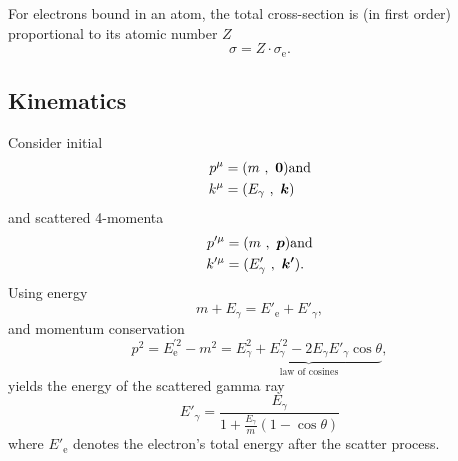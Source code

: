 For electrons bound in an atom, the total cross-section is (in first order) proportional to its atomic number $Z$
\begin{equation*}
	\sigma = Z\cdot\sigma_\text{e}.
\end{equation*}
\subsection{Kinematics}
Consider initial
\begin{align*}
	p^\mu &= (m\ ,\ \boldsymbol{0}) \text{and}\\
	k^\mu &= (E_\gamma\ ,\ \boldsymbol{k})
\end{align*}
and scattered 4-momenta
\begin{align*}
	p'^\mu &= (m\ ,\ \boldsymbol{p}) \text{and}\\
	k'^\mu &= (E'_\gamma\ ,\ \boldsymbol{k'}).
\end{align*}
Using energy
\begin{equation*}
	m + E_\gamma = E'_\text{e} + E'_\gamma,
\end{equation*}
and momentum conservation
\begin{equation*}
	p^2 = E_\text{e}^{'2} - m^2 = \underbrace{E_\gamma^2 + E_\gamma^{'2} - 2E_\gamma E'_\gamma\cos\theta}_\text{law of cosines},
\end{equation*}
yields the energy of the scattered gamma ray
\begin{equation}\label{eq:energy_shift}
	E'_\gamma = \frac{E_\gamma}{1 + \frac{E_\gamma}{m}\left(1 - \cos\theta\right)}
\end{equation}
where $E'_\text{e}$ denotes the electron's total energy after the scatter process.

